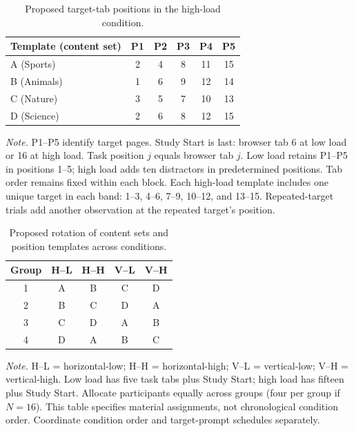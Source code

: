 \begin{table}[t]
\centering
\caption{Proposed target-tab positions in the high-load condition.}
\label{tab:target-positions}
\small
\begin{tabular}{lccccc}
\hline
Template (content set) & P1 & P2 & P3 & P4 & P5 \\
\hline
A (Sports) & 2 & 4 & 8 & 11 & 15 \\
B (Animals) & 1 & 6 & 9 & 12 & 14 \\
C (Nature) & 3 & 5 & 7 & 10 & 13 \\
D (Science) & 2 & 6 & 8 & 12 & 15 \\
\hline
\end{tabular}
\medskip
\begin{minipage}{\linewidth}
\footnotesize
\textit{Note.} P1--P5 identify target pages. Study Start is last: browser
tab 6 at low load or 16 at high load. Task position $j$ equals browser
tab $j$. Low load retains P1--P5 in positions 1--5; high load adds ten
distractors in predetermined positions. Tab order remains fixed within
each block. Each high-load template includes one unique target in each
band: 1--3, 4--6, 7--9, 10--12, and 13--15. Repeated-target trials add
another observation at the repeated target's position.
\end{minipage}
\end{table}

\begin{table}[t]
\centering
\caption{Proposed rotation of content sets and position templates across conditions.}
\label{tab:template-assignment}
\small
\begin{tabular}{ccccc}
\hline
Group & H--L & H--H & V--L & V--H \\
\hline
1 & A & B & C & D \\
2 & B & C & D & A \\
3 & C & D & A & B \\
4 & D & A & B & C \\
\hline
\end{tabular}
\medskip
\begin{minipage}{\linewidth}
\footnotesize
\textit{Note.} H--L = horizontal-low; H--H = horizontal-high;
V--L = vertical-low; V--H = vertical-high. Low load has five task
tabs plus Study Start; high load has fifteen plus Study Start. Allocate
participants equally across groups (four per group if $N=16$). This
table specifies material assignments, not chronological condition order.
Coordinate condition order and target-prompt schedules separately.
\end{minipage}
\end{table}

